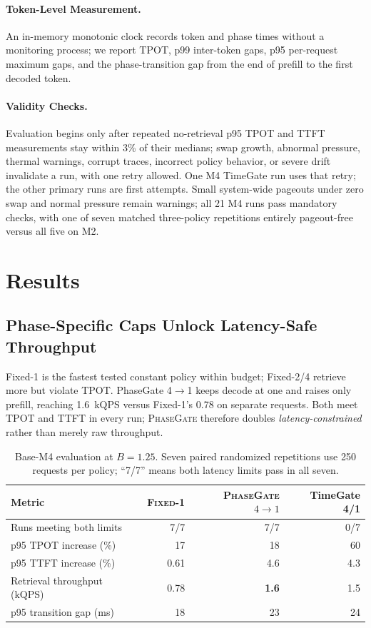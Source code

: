 \documentclass{article}
\newcommand{\system}{\textsc{PhaseGate}\xspace}
\newcommand{\fixed}[1]{\textsc{Fixed}-#1}
\newcommand{\gate}[2]{\textsc{PhaseGate} $#1{\rightarrow}#2$}
\newcommand{\tpot}{\textsc{TPOT}\xspace}
\newcommand{\ttft}{\textsc{TTFT}\xspace}
\begin{document}
\paragraph{Token-Level Measurement.}
An in-memory monotonic clock records token and phase times without a monitoring process; we report TPOT, p99 inter-token gaps, p95 per-request maximum gaps, and the phase-transition gap from the end of prefill to the first decoded token.

\paragraph{Validity Checks.}
Evaluation begins only after repeated no-retrieval p95 TPOT and TTFT measurements stay within 3\% of their medians; swap growth, abnormal pressure, thermal warnings, corrupt traces, incorrect policy behavior, or severe drift invalidate a run, with one retry allowed.
One M4 TimeGate run uses that retry; the other primary runs are first attempts.
Small system-wide pageouts under zero swap and normal pressure remain warnings; all 21 M4 runs pass mandatory checks, with one of seven matched three-policy repetitions entirely pageout-free versus all five on M2.

\section{Results}

\subsection{Phase-Specific Caps Unlock Latency-Safe Throughput}

Fixed-1 is the fastest tested constant policy within budget; Fixed-2/4 retrieve more but violate TPOT.
PhaseGate 4$\rightarrow$1 keeps decode at one and raises only prefill, reaching 1.6~kQPS versus Fixed-1's 0.78 on separate requests.
Both meet TPOT and TTFT in every run; \system therefore doubles \emph{latency-constrained} rather than merely raw throughput.

\begin{table}[h]
  \caption{Base-M4 evaluation at $B=1.25$.
Seven paired randomized repetitions use 250 requests per policy; ``7/7'' means both latency limits pass in all seven.}
  \label{tab:primary}
  \centering
  \scriptsize
  \setlength{\tabcolsep}{2.7pt}
  \begin{tabular}{lrrr}
    \toprule
    Metric & \fixed{1} & \gate{4}{1} & TimeGate 4/1 \\
    \midrule
    Runs meeting both limits & 7/7 & 7/7 & 0/7 \\
    p95 \tpot increase (\%) & 17 & 18 & 60 \\
    p95 \ttft increase (\%) & 0.61 & 4.6 & 4.3 \\
    Retrieval throughput (kQPS) & 0.78 & \textbf{1.6} & 1.5 \\
    p95 transition gap (ms) & 18 & 23 & 24 \\
    \bottomrule
  \end{tabular}
\end{table}
\end{document}
